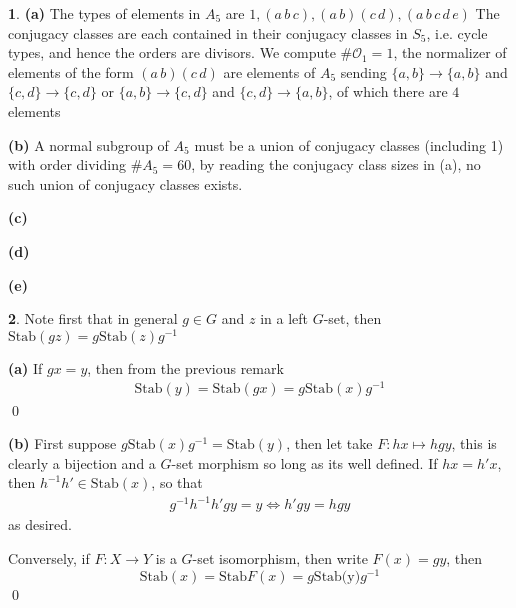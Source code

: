 \documentclass[10.5pt]{article}
\theoremstyle{definition}
\newtheorem{pb}{}
\newcommand{\set}[1]{\{#1\}}
\begin{document}
    \begin{pb}
        \textbf{(a)}
            The types of elements in \(A_5\) are \(1,(a\,b\,c), (a\,b)(c\,d),(a\,b\,c\,d\,e)\) The conjugacy classes are each contained in their conjugacy classes in \(S_5\), i.e. cycle types, and hence the orders are divisors. We compute \(\#\mathcal{O}_1 = 1\), the normalizer of elements of the form \((a\,b)(c\,d)\) are elements of \(A_5\) sending \(\set{a,b} \to \set{a,b}\) and \(\set{c,d} \to \set{c,d}\) or \(\set{a,b} \to \set{c,d}\) and \(\set{c,d} \to \set{a,b}\), of which there are \(4\) elements

        \textbf{(b)} A normal subgroup of \(A_5\) must be a union of conjugacy classes (including 1) with order dividing \(\#A_5 = 60\), by reading the conjugacy class sizes in (a), no such union of conjugacy classes exists.

        \textbf{(c)}

        \textbf{(d)}

        \textbf{(e)}
    \end{pb}
    \begin{pb}
        Note first that in general \(g \in G\) and \(z\) in a left \(G\)-set, then \(\text{Stab}(gz) = g\text{Stab}(z)g^{-1}\)
        
        \textbf{(a)} 
        If \(gx = y\), then from the previous remark
        \begin{align*}
            \text{Stab}(y) = \text{Stab}(gx) = g\text{Stab}(x)g^{-1}
        \end{align*}\qed
        
        \textbf{(b)} First suppose \(g\text{Stab}(x)g^{-1} = \text{Stab}(y)\), then let take \(F: hx \mapsto hgy\), this is clearly a bijection and a \(G\)-set morphism so long as its well defined. If \(hx = h'x\), then \(h^{-1}h' \in \text{Stab}(x)\), so that
        \begin{align*}
            g^{-1}h^{-1}h'gy = y \iff h'gy = hgy
        \end{align*}
        as desired.
        
        Conversely, if \(F: X \to Y\) is a \(G\)-set isomorphism, then write \(F(x) = gy\), then \[\text{Stab}(x) = \text{Stab}F(x) = g\text{Stab(y)}g^{-1}\] \qed
    \end{pb}
\end{document}
